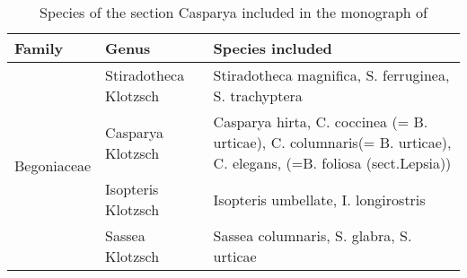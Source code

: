 \begin{table}[htbp]
  \centering
  \caption{Species of the section Casparya included in the monograph of }
    \begin{tabular}{cll}
    \toprule
    \multicolumn{1}{l}{Family} & Genus & Species included \\
    \midrule
    \multirow{4}[8]{*}{Begoniaceae} & Stiradotheca Klotzsch & Stiradotheca magnifica, S. ferruginea, S. trachyptera \\
\cmidrule{2-3}          & Casparya Klotzsch & \multicolumn{1}{p{37.355em}}{Casparya hirta, C. coccinea (= B. urticae), C. columnaris\newline{}(= B. urticae), C. elegans, (=B. foliosa (sect.\newline{}Lepsia))} \\
\cmidrule{2-3}          & Isopteris Klotzsch & Isopteris umbellate, I. longirostris \\
\cmidrule{2-3}          & Sassea Klotzsch & Sassea columnaris, S. glabra, S. urticae \\
    \bottomrule
    \bottomrule
    \end{tabular}%
  \label{tab:addlabel}%
\end{table}%
